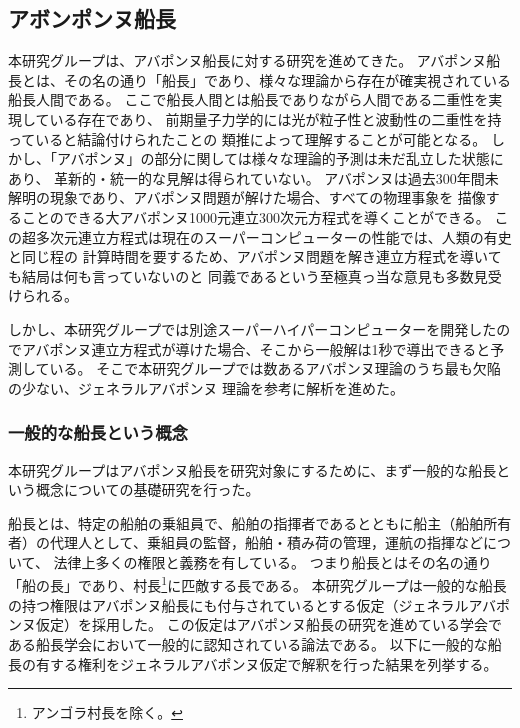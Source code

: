 \documentclass[12pt]{jsarticle}
\begin{document}
\subsection{アボンポンヌ船長}
本研究グループは、アバポンヌ船長に対する研究を進めてきた。
アバポンヌ船長とは、その名の通り「船長」であり、様々な理論から存在が確実視されている船長人間である。
ここで船長人間とは船長でありながら人間である二重性を実現している存在であり、
前期量子力学的には光が粒子性と波動性の二重性を持っていると結論付けられたことの
類推によって理解することが可能となる。
しかし、「アバポンヌ」の部分に関しては様々な理論的予測は未だ乱立した状態にあり、
革新的・統一的な見解は得られていない。
アバポンヌは過去300年間未解明の現象であり、アバポンヌ問題が解けた場合、すべての物理事象を
描像することのできる大アバポンヌ1000元連立300次元方程式を導くことができる。
この超多次元連立方程式は現在のスーパーコンピューターの性能では、人類の有史と同じ程の
計算時間を要するため、アバポンヌ問題を解き連立方程式を導いても結局は何も言っていないのと
同義であるという至極真っ当な意見も多数見受けられる。\par

しかし、本研究グループでは別途スーパーハイパーコンピューターを開発したのでアバポンヌ連立方程式が導けた場合、そこから一般解は1秒で導出できると予測している。
そこで本研究グループでは数あるアバポンヌ理論のうち最も欠陥の少ない、ジェネラルアバポンヌ
理論を参考に解析を進めた。

\subsubsection{一般的な船長という概念}
本研究グループはアバポンヌ船長を研究対象にするために、まず一般的な船長という概念についての基礎研究を行った。\par
船長とは、特定の船舶の乗組員で、船舶の指揮者であるとともに船主（船舶所有者）の代理人として、乗組員の監督，船舶・積み荷の管理，運航の指揮などについて、
法律上多くの権限と義務を有している。
つまり船長とはその名の通り「船の長」であり、村長\footnote{アンゴラ村長を除く。}に匹敵する長である。
本研究グループは一般的な船長の持つ権限はアバポンヌ船長にも付与されているとする仮定（ジェネラルアバポンヌ仮定）を採用した。
この仮定はアバポンヌ船長の研究を進めている学会である船長学会において一般的に認知されている論法である。
以下に一般的な船長の有する権利をジェネラルアバポンヌ仮定で解釈を行った結果を列挙する。
\end{document}
